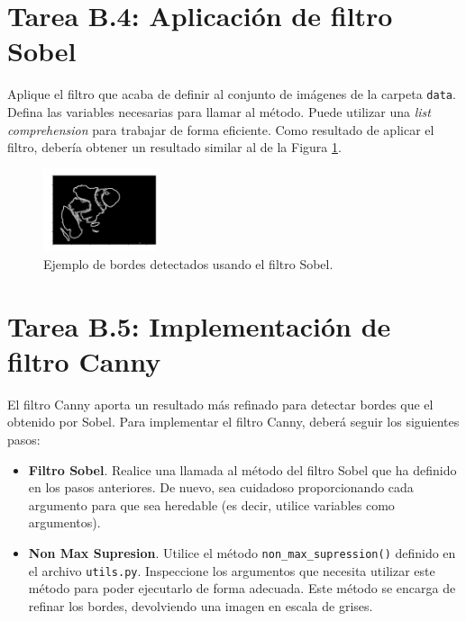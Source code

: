 \section*{Tarea B.4: Aplicación de filtro Sobel}
{}

Aplique el filtro que acaba de definir al conjunto de imágenes de la carpeta \texttt{data}. Defina las variables necesarias para llamar al método. Puede utilizar una \textit{list comprehension} para trabajar de forma eficiente. Como resultado de aplicar el filtro, debería obtener un resultado similar al de la Figura \ref{fig:edges}.

\begin{figure}[H]
    \centering
    \includegraphics[width=0.3\textwidth]{Lab_2/template/figures/edges.png}
    \caption{Ejemplo de bordes detectados usando el filtro Sobel.}
    \label{fig:edges}
\end{figure}

\section*{Tarea B.5: Implementación de filtro Canny}
{}
El filtro Canny aporta un resultado más refinado para detectar bordes que el obtenido por Sobel. Para implementar el filtro Canny, deberá seguir los siguientes pasos:

\begin{itemize}
    \item \textbf{Filtro Sobel}. Realice una llamada al método del filtro Sobel que ha definido en los pasos anteriores. De nuevo,  sea cuidadoso proporcionando cada argumento para que sea heredable (es decir, utilice variables como argumentos).
    \item \textbf{Non Max Supresion}. Utilice el método \texttt{non\_max\_supression()} definido en el archivo \texttt{utils.py}. Inspeccione los argumentos que necesita utilizar este método para poder ejecutarlo de forma adecuada. Este método se encarga de refinar los bordes, devolviendo una imagen en escala de grises. 
\end{itemize}

